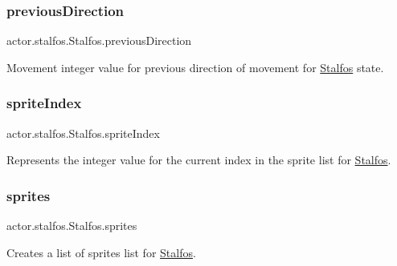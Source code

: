 \subsubsection{\texorpdfstring{previous\+Direction}{previousDirection}}
{\footnotesize\ttfamily actor.\+stalfos.\+Stalfos.\+previous\+Direction}



Movement integer value for previous direction of movement for \hyperlink{classactor_1_1stalfos_1_1_stalfos}{Stalfos} state. 

\mbox{\label{classactor_1_1stalfos_1_1_stalfos_a9036a53b8457cda5d4955ad65dde6ae0}} 
\subsubsection{\texorpdfstring{sprite\+Index}{spriteIndex}}
{\footnotesize\ttfamily actor.\+stalfos.\+Stalfos.\+sprite\+Index}



Represents the integer value for the current index in the sprite list for \hyperlink{classactor_1_1stalfos_1_1_stalfos}{Stalfos}. 

\mbox{\label{classactor_1_1stalfos_1_1_stalfos_ae17287c8f3a51b650b3f99cad297b3f1}} 
\subsubsection{\texorpdfstring{sprites}{sprites}}
{\footnotesize\ttfamily actor.\+stalfos.\+Stalfos.\+sprites}



Creates a list of sprites list for \hyperlink{classactor_1_1stalfos_1_1_stalfos}{Stalfos}. 

\mbox{\label{classactor_1_1stalfos_1_1_stalfos_ae583478be5ec05f00f4f3fb460516012}} 
